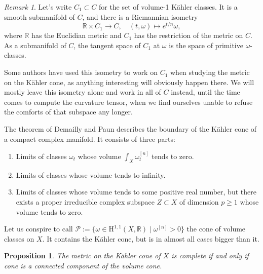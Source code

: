 \documentclass[12pt,a4paper]{amsart}
\newtheorem{prop}[theo]{Proposition}
\theoremstyle{definition}
\theoremstyle{remark}
\newtheorem*{rema}{Remark}
\newcommand{\RR}{\mathbb{R}}
\def\coho#1{\mathrm{H}^{#1}}
\def\kf{\omega}
\def\^#1{^{[#1]}}
\begin{document}
\begin{rema}
Let's write $C_1 \subset C$ for the set of volume-1 K\"{a}hler classes. It is a
smooth submanifold of $C$, and there is a Riemannian isometry
$$
\RR \times C_1 \to C,
\quad
(t, \kf) \mapsto e^{t/n} \kf,
$$
where $\RR$ has the Euclidian metric and $C_1$ has the restriction of the metric
on $C$. As a submanifold of $C$, the tangent space of $C_1$ at $\kf$ is the
space of primitive $\kf$-classes.

Some authors have used this isometry to work on $C_1$ when studying the metric
on the K\"{a}hler cone, as anything interesting will obviously happen there. We will
mostly leave this isometry alone and work in all of $C$ instead, until the time
comes to compute the curvature tensor, when we find ourselves unable to refuse
the comforts of that subspace any longer.
\end{rema}



The theorem of Demailly and Paun describes the boundary of the
K\"{a}hler cone of a compact complex manifold. It consists of three
parts:
\begin{enumerate}
\item Limits of classes $\kf_t$ whose volume $\int_X \kf_t\^n$
tends to zero.
\item Limits of classes whose volume tends to infinity.
\item Limits of classes whose volume tends to some positive real
number, but there exists a proper irreducible complex subspace $Z
\subset X$ of dimension $p \geq 1$ whose volume tends to zero.
\end{enumerate}

Let us conspire to call $\mathcal{P} := \{\kf \in \coho{1,1}(X,\RR) \mid \kf\^n
> 0\}$ the cone of volume classes on $X$. It contains the K\"{a}hler cone, but
is in almost all cases bigger than it.

\begin{prop}
\label{prop:fofo}
The metric on the K\"{a}hler cone of $X$ is complete if and only if cone is a
connected component of the volume cone.
\end{prop}
\end{document}
